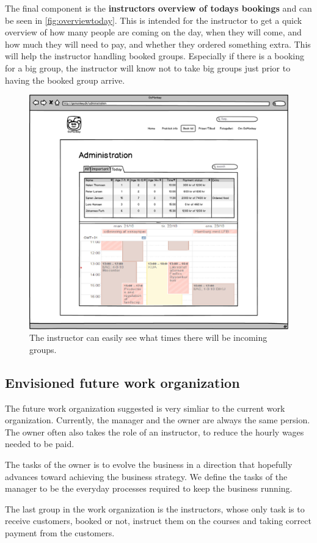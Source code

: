 \FloatBarrier
\newpage

The final component is the \textbf{instructors overview of todays bookings} and can be seen in
\autoref{fig:overviewtoday}. This is intended for 
the instructor to get a quick overview of how many people are coming on the 
day, when they will come, and how much they will need to pay, and whether
they ordered something extra. This will help the instructor handling booked 
groups. Especially if there is a booking for a big group, the instructor will
know not to take big groups just prior to having the booked group arrive.

\begin{figure}[htbp]
    \centering
        \includegraphics[width=.6\textwidth]{figures/mockup/overview_today.png}
	    \caption{The instructor can easily see what times there will be incoming groups.}
        \label{fig:overviewtoday}
\end{figure}


\subsection{Envisioned future work organization}
The future work organization suggested is very simliar to the current 
work organization. Currently, the manager and the owner are always the same 
persion. The owner often also takes the role of an instructor, to reduce the 
hourly wages needed to be paid. 

The tasks of the owner is to evolve the business in a direction that hopefully 
advances toward achieving the business strategy. We define the tasks of the 
manager to be the everyday processes required to keep the business running. 

The last group in the work organization is the instructors, whose only task is to
receive customers, booked or not, instruct them on the courses and taking 
correct payment from the customers.

